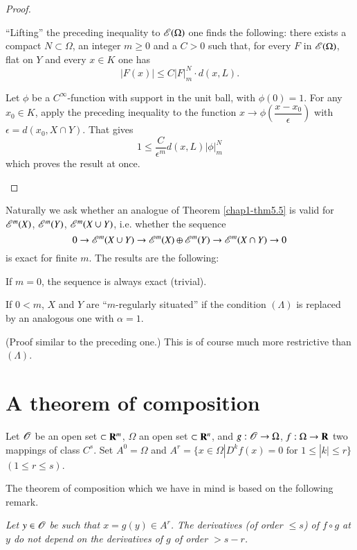 \begin{proof}
\begin{itemize}
``Lifting'' the preceding inequality to $\mathscr{E}(\Omega)$ one finds the following: there exists a compact $N\subset \Omega$, an integer $m\geq 0$ and a $C>0$ such that, for every $F$ in $\mathscr{E}(\Omega)$, flat on $Y$ and every $x\in K$ one has
$$
|F(x)|\leq C|F|^{N}_{m}\cdot d(x,L).
$$

Let $\phi$ be a $C^{\infty}$-function with support in the unit ball, with $\phi(0)=1$. For any $x_{0}\in K$, apply the preceding inequality to the function $x\to \phi \left(\dfrac{x-x_{0}}{\epsilon}\right)$ with $\epsilon=d(x_{0},X\cap Y)$. That gives
$$
1\leq \dfrac{C}{\epsilon^{m}}d(x,L)|\phi|^{N}_{m}
$$
which proves the result at once.
\end{itemize}
\end{proof}

\begin{remark}\label{chap1-rem5.6}
Naturally we ask whether an analogue of Theorem \ref{chap1-thm5.5} is valid for $\mathscr{E}^{m}(X)$, $\mathscr{E}^{m}(Y)$, $\mathscr{E}^{m}(X\cup Y)$, i.e. whether the sequence
$$
0\to \mathscr{E}^{m}(X\cup Y)\to \mathscr{E}^{m}(X)\oplus \mathscr{E}^{m}(Y)\to \mathscr{E}^{m}(X\cap Y)\to 0
$$
is exact for finite $m$. The results are the following:

If $m=0$, the sequence is always exact (trivial).

If $0<m$, $X$ and $Y$ are ``$m$-regularly situated'' if the condition $(\Lambda)$ is replaced by an analogous one with $\alpha=1$.
\end{remark}

(Proof similar to the preceding one.) This is of course much more restrictive than $(\Lambda)$.

\section{A theorem of composition\protect\footnotemark[1]}

Let $\mathscr{O}$ be an open set $\subset \mathbf{R}^{m}$, $\Omega$ an open set $\subset \mathbf{R}^{n}$, and $g:\mathscr{O}\to \Omega$, $f:\Omega\to \mathbf{R}$ two mappings of class $C^{s}$. Set $A^{0}=\Omega$ and $A^{r}=\{x\in \Omega|D^{k}f(x)=0 \text{ for } 1\leq |k|\leq r\}$ $(1\leq r\leq s)$.

The theorem of composition which we have in mind is based on the following remark.

{\em Let $y\in \mathscr{O}$ be such that $x=g(y)\in A^{r}$. The derivatives (of order $\leq s$) of $f\circ g$ at $y$ do not depend on the derivatives of $g$ of order $>s-r$.}


